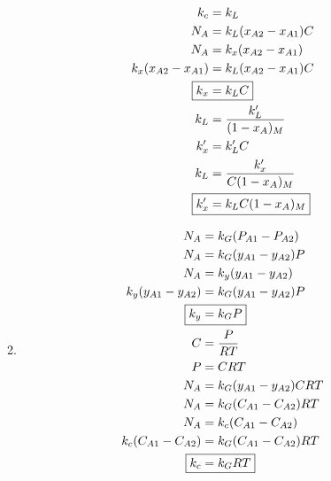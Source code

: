 \documentclass[12pt]{article}
\begin{document}
\begin{enumerate}
\begin{enumerate}
\begin{align*}
            k_c &= k_L \\
            N_A &= k_L (x_{A2} - x_{A1}) C \\
            N_A &= k_x (x_{A2} - x_{A1}) \\
            k_x (x_{A2} - x_{A1}) &= k_L (x_{A2} - x_{A1}) C \\
            \Aboxed{k_x &= k_L C} \\
            k_L &= \frac{k'_L}{(1 - x_A)_M} \\
            k'_x &= k'_L C \\
            k_L &= \frac{k'_x}{C (1 - x_A)_M} \\
            \Aboxed{k'_x &= k_L C (1 - x_A)_M} \\
        \end{align*}
        \item
        \begin{align*}
            N_A &= k_G (P_{A1} - P_{A2}) \\
            N_A &= k_G (y_{A1} - y_{A2}) P \\
            N_A &= k_y (y_{A1} - y_{A2}) \\
            k_y (y_{A1} - y_{A2}) &= k_G (y_{A1} - y_{A2}) P \\
            \Aboxed{k_y &= k_G P} \\
            C &= \frac{P}{RT} \\
            P &= CRT \\
            N_A &= k_G (y_{A1} - y_{A2}) CRT \\
            N_A &= k_G (C_{A1} - C_{A2}) RT \\
            N_A &= k_c (C_{A1} - C_{A2}) \\
            k_c (C_{A1} - C_{A2}) &= k_G (C_{A1} - C_{A2}) RT \\
            \Aboxed{k_c &= k_G RT} \\
        \end{align*}
    \end{enumerate}


\end{enumerate}
\end{document}
